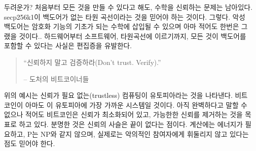 \begin{comment}
	Sounds scary? Well, even if you would be able to build everything from
	scratch, you would still have to trust the underlying mathematics. You
	would have to trust that \textit{secp256k1} is an elliptic curve without
	backdoors. Yes, malicious backdoors can be inserted in the mathematical
	foundations of cryptographic functions and arguably this has already
	happened at least once.~\cite{wiki:Dual_EC_DRBG} There are good reasons to be paranoid, and the
	fact that everything from your hardware, to your software, to the
	elliptic curves used can have backdoors~\cite{wiki:backdoors} are some of them.
\end{comment}
두려운가? 처음부터 모든 것을 만들 수 있다고 해도, 수학을 신뢰하는 문제는 남아있다.
secp256k1이 백도어가 없는 타원 곡선이라는 것을 믿어야 하는 것이다.
그렇다. 악성 백도어는 암호화 기능의 기초가 되는 수학에 삽입될 수 있으며 아마 적어도 한번은 그랬을 것이다.\cite{wiki:Dual_EC_DRBG}.
하드웨어부터 소프트웨어, 타원곡선에 이르기까지, 모든 것이 백도어\cite{wiki:backdoors}를 포함할 수 있다는 사실은 편집증을 유발한다.


\begin{quotation}\begin{samepage}
		\enquote{신뢰하지 말고 검증하라(Don’t trust. Verify).}
		\begin{flushright} -- 도처의 비트코이너들
\end{flushright}\end{samepage}\end{quotation}

\begin{comment}
	The above exampes should illustrate that \textit{trustless} computing is
	utopic. Bitcoin is probably the one system which comes closest to this
	utopia, but still, it is \textit{trust-minimized} --- aiming to remove trust
	wherever possible. Arguably, the chain-of-trust is neverending, since
	you will also have to trust that computation requires energy, that P
	does not equal NP, and that you are actually in base reality and not
	imprisoned in a simulation by malicious actors.
\end{comment}
위의 예시는 신뢰가 필요 없는(trustless) 컴퓨팅이 유토피아라는 것을 나타낸다.
비트코인이 아마도 이 유토피아에 가장 가까운 시스템일 것이다.
아직 완벽하다고 말할 수 없으나 적어도 비트코인은 신뢰가 최소화되어 있고, 가능한한 신뢰를 제거하는 것을 목표로 하고 있다.
분명한 것은 신뢰의 사슬은 끝이 없다는 점이다.
계산에는 에너지가 필요하고, P는 NP와 같지 않으며, 실제로는 악의적인 참여자에게 휘둘리지 않고 있다는 점도 믿어야 한다.

